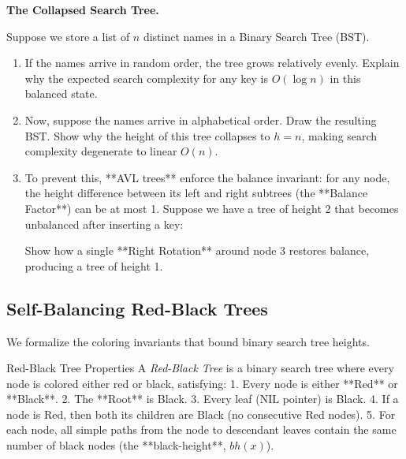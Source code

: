 \documentclass[12pt, a4paper]{book}
\newcommand{\newterm}[1]{\textit{\textcolor{DiscoveryColor}{#1}}}
\begin{document}
\begin{puzzlebox}
\textbf{The Collapsed Search Tree.}

Suppose we store a list of $n$ distinct names in a Binary Search Tree (BST).
\begin{enumerate}[label=(\alph*), leftmargin=*]
  \item If the names arrive in random order, the tree grows relatively evenly.
        Explain why the expected search complexity for any key is $O(\log n)$ in this balanced state.
  \item Now, suppose the names arrive in alphabetical order.
        Draw the resulting BST.
        Show why the height of this tree collapses to $h = n$, making search complexity degenerate to linear $O(n)$.
  \item To prevent this, **AVL trees** enforce the balance invariant: for any node, the height difference between its left and right subtrees (the **Balance Factor**) can be at most 1.
        Suppose we have a tree of height 2 that becomes unbalanced after inserting a key:
        \begin{center}
        \end{center}
        Show how a single **Right Rotation** around node 3 restores balance, producing a tree of height 1.
\end{enumerate}
\end{puzzlebox}

\subsection{Self-Balancing Red-Black Trees}

We formalize the coloring invariants that bound binary search tree heights.

\begin{namedconcept}{Red-Black Tree Properties}
A \newterm{Red-Black Tree} is a binary search tree where every node is colored either red or black, satisfying:
1. Every node is either **Red** or **Black**.
2. The **Root** is Black.
3. Every leaf ($\text{NIL}$ pointer) is Black.
4. If a node is Red, then both its children are Black (no consecutive Red nodes).
5. For each node, all simple paths from the node to descendant leaves contain the same number of black nodes (the **black-height**, $bh(x)$).
\end{namedconcept}
\end{document}
